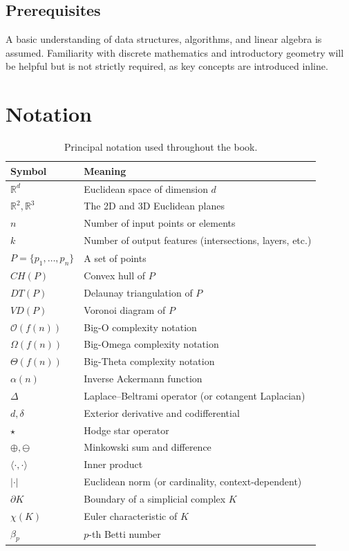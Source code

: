 \section*{Prerequisites}
A basic understanding of data structures, algorithms, and linear algebra is assumed. Familiarity with discrete mathematics and introductory geometry will be helpful but is not strictly required, as key concepts are introduced inline.

\chapter*{Notation}

\begin{table}[h]
\centering
\begin{tabular}{@{}ll@{}}
\toprule
\textbf{Symbol} & \textbf{Meaning} \\
\midrule
$\mathbb{R}^d$ & Euclidean space of dimension $d$ \\
$\mathbb{R}^2, \mathbb{R}^3$ & The 2D and 3D Euclidean planes \\
$n$ & Number of input points or elements \\
$k$ & Number of output features (intersections, layers, etc.) \\
$P = \{p_1, \dots, p_n\}$ & A set of points \\
$CH(P)$ & Convex hull of $P$ \\
$DT(P)$ & Delaunay triangulation of $P$ \\
$VD(P)$ & Voronoi diagram of $P$ \\
$\mathcal{O}(f(n))$ & Big-O complexity notation \\
$\Omega(f(n))$ & Big-Omega complexity notation \\
$\Theta(f(n))$ & Big-Theta complexity notation \\
$\alpha(n)$ & Inverse Ackermann function \\
$\Delta$ & Laplace--Beltrami operator (or cotangent Laplacian) \\
$d, \delta$ & Exterior derivative and codifferential \\
$\star$ & Hodge star operator \\
$\oplus, \ominus$ & Minkowski sum and difference \\
$\langle \cdot, \cdot \rangle$ & Inner product \\
$| \cdot |$ & Euclidean norm (or cardinality, context-dependent) \\
$\partial K$ & Boundary of a simplicial complex $K$ \\
$\chi(K)$ & Euler characteristic of $K$ \\
$\beta_p$ & $p$-th Betti number \\
\bottomrule
\end{tabular}
\caption{Principal notation used throughout the book.}
\label{tab:notation}
\end{table}
